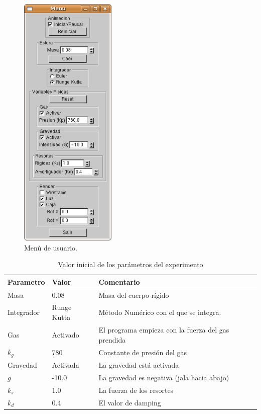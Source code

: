 \begin{figure}
 \centering
 \includegraphics[]{Img/menu}
 \caption[Menú de usuario del programa]{Menú de usuario.}
 \label{programa:menu}
\end{figure}

\begin{table}
\begin{center}
\begin{tabular} {@{}llp{10cm}@{}}
\toprule
Parametro & Valor & Comentario\\
\midrule
 Masa & 0.08 & Masa del cuerpo rígido \\
 Integrador & Runge Kutta & Método Numérico con el que se integra. \\
 Gas & Activado & El programa empieza con la fuerza del gas prendida \\
 $k_g$ & 780 & Constante de presión del gas \\
 Gravedad & Activada & La gravedad está activada \\
 $g$ & -10.0 & La gravedad es negativa (jala hacia abajo) \\
 $k_s$ & 1.0 & La fuerza de los resortes \\
 $k_d$ & 0.4 & El valor de damping \\
\bottomrule
\end{tabular}
\end{center}
\caption[Tabla con los valores de defecto de los parámetros]{Valor inicial de los parámetros del experimento}
\label{valores:variables}
\end{table}

